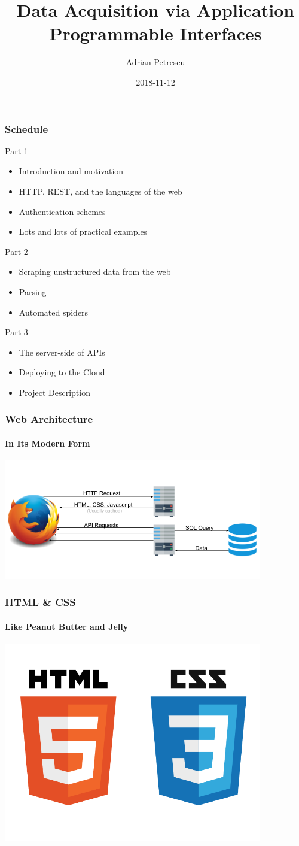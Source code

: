 \documentclass[dvipsnames]{beamer}
\title[Data Acquisition via APIs]{Data Acquisition via Application Programmable Interfaces}
\author{Adrian Petrescu}
\institute{Rubikloud}
\date{2018-11-12}
\begin{document}
\frame{\titlepage}


\begin{frame}
  \frametitle{Schedule}
  
  Part 1
  \begin{itemize}
    \item Introduction and motivation
    \item HTTP, REST, and the languages of the web
    \item Authentication schemes
    \item Lots and lots of practical examples
  \end{itemize}

  \alert{Part 2}
  \begin{itemize}
    \item Scraping unstructured data from the web
    \item Parsing 
    \item Automated spiders
  \end{itemize}

  Part 3
  \begin{itemize}
    \item The server-side of APIs
    \item Deploying to the Cloud
    \item Project Description
  \end{itemize}
\end{frame}


\begin{frame}
  \frametitle{Web Architecture}
  \framesubtitle{In Its Modern Form}
  \includegraphics[width=320pt]{img/web-architecture-2.png}
\end{frame}


\begin{frame}
  \frametitle{HTML \& CSS}
  \framesubtitle{Like Peanut Butter and Jelly}
  \includegraphics[width=320pt]{img/html-css.png}
\end{frame}
\end{document}
